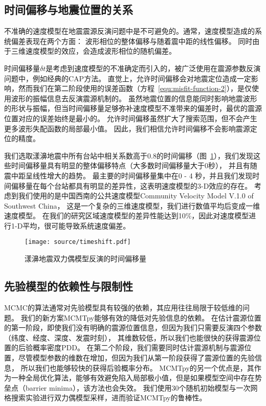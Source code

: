 \subsection{时间偏移与地震位置的关系}

不准确的速度模型在地震震源反演问题中是不可避免的。通常，速度模型造成的系统偏差表现在两个方面：
波形相位的整体偏移与随着震中距的线性偏移。
同时由于三维速度模型的效应，会造成波形相位的随机偏差。

时间偏移量$\delta t$是考虑到速度模型的不准确定而引入的，被广泛使用在震源参数反演问题中，例如经典的CAP方法\citep{Zhu1996}。
直觉上，允许时间偏移会对地震定位造成一定影响，然而我们在第二阶段使用的误差函数（方程~\ref{equ:misfit-function-2}），是仅使用波形的振幅信息去反演震源机制的。
虽然地震位置的信息能同时影响地震波形的形状与振幅，但当时间偏移量足够弥补速度模型不准带来的偏差时，最优的震源位置对应的误差始终是最小的。
允许时间偏移虽然扩大了搜索范围，但不会产生更多波形失配函数的局部最小值。
因此，我们相信允许时间偏移不会影响震源定位的精度。

我们选取漾濞地震中所有台站中相关系数高于0.8的时间偏移（图~\ref{fig:timeshift}），我们发现这些时间偏移量具有明显的整体偏移特点（大多数时间偏移量大于0秒），
并且有随震中距呈线性增大的趋势。
最主要的时间偏移量集中在0 - 4 秒，并且我们发现时间偏移量在每个台站都具有明显的差异性，这表明速度模型的3-D效应的存在。
考虑到我们使用的是中国西南的公共速度模型Community Velocity Model V.1.0 of Southwest China\citep{Liu2021}，
这是一个复杂的三维速度模型，我们进行数值平均后变成一维速度模型。
在我们的研究区域速度模型的差异性能达到10\%，因此对速度模型进行1-D平均，很可能导致系统速度偏差。

\begin{figure}[h]
    \centering
    \texttt{[image: source/timeshift.pdf]}
    \caption{漾濞地震双力偶模型反演的时间偏移量}
    \label{fig:timeshift}
\end{figure}



\subsection{先验模型的依赖性与限制性}

MCMC的算法通常对先验模型具有较强的依赖，其应用往往局限于较低维的问题\citep{Fang2019}。
我们的新方案MCMTpy能够有效的降低对先验信息的依赖。
在估计震源位置的第一阶段，即使我们没有明确的震源位置信息，但因为我们只需要反演四个参数（纬度、经度、深度、发震时刻），
其维数较低，所以我们也能很快的获得震源位置的后验概率密度PDD。
在第二个阶段，我们需要同时估计震源机制与震源位置，尽管模型参数的维数在增加，但因为我们从第一阶段获得了震源位置的先验信息，
所以我们也能够较快的获得后验概率分布。
MCMTpy的另一个优点是，其作为一种全局优化算法，能够有效避免陷入局部极小值，但是如果模型空间中存在势垒点（barrier minima），该方法也会失效。
我们使用30个随机初始模型与一次网格搜索实验进行双力偶模型采样，进而验证MCMTpy的鲁棒性。

